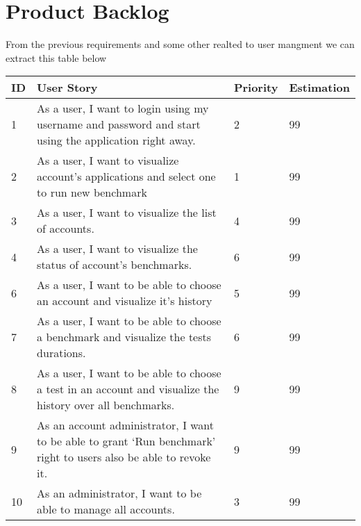 \section{Product Backlog}
From the previous requirements and some other realted to user mangment we can
extract this table below
\begin{center}
  \begin{tabular}{ | p{1cm}  | p{9cm}  | p{2cm} | p{2cm}| }
    \hline

    ID & User Story                                                                                                        & Priority        & Estimation\\ \hline

    1 & As a user, I want to login using my username and password and start using the application right away.              & 2              & 99        \\ \hline
    2 & As a user, I want to visualize account’s applications and select one to run new benchmark                          & 1              & 99        \\ \hline
    3 & As a user, I want to visualize the list of accounts.                                                               & 4              & 99        \\ \hline
    4 & As a user, I want to visualize the status of account’s benchmarks.                                                 & 6              & 99        \\ \hline
    6 & As a user, I want to be able to choose an account and visualize it’s history                                       & 5              & 99        \\ \hline
    7 & As a user, I want to be able to choose a benchmark and visualize the tests durations.                              & 6              & 99        \\ \hline
    8 & As a user, I want to be able to choose a test in an account and visualize the history over all benchmarks.         & 9              & 99        \\ \hline
    9 & As an account administrator, I want to be able to grant ‘Run benchmark’  right to users also be able to revoke it. & 9              & 99        \\ \hline
    10 & As an administrator, I want to be able to manage all accounts.                                                    & 3              & 99        \\ \hline

    \hline
  \end{tabular}
\end{center}
